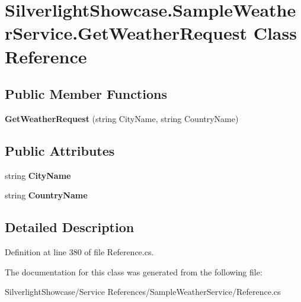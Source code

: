 \hypertarget{class_silverlight_showcase_1_1_sample_weather_service_1_1_get_weather_request}{
\section{SilverlightShowcase.SampleWeatherService.GetWeatherRequest Class Reference}
\label{class_silverlight_showcase_1_1_sample_weather_service_1_1_get_weather_request}
}
\subsection*{Public Member Functions}
\begin{DoxyCompactItemize}
\item 
\hypertarget{class_silverlight_showcase_1_1_sample_weather_service_1_1_get_weather_request_a1fa74c6662cc32c1ea8ee24805762381}{
{\bfseries GetWeatherRequest} (string CityName, string CountryName)}
\label{class_silverlight_showcase_1_1_sample_weather_service_1_1_get_weather_request_a1fa74c6662cc32c1ea8ee24805762381}

\end{DoxyCompactItemize}
\subsection*{Public Attributes}
\begin{DoxyCompactItemize}
\item 
\hypertarget{class_silverlight_showcase_1_1_sample_weather_service_1_1_get_weather_request_aaf78b13634979a4778659b2f486ad012}{
string {\bfseries CityName}}
\label{class_silverlight_showcase_1_1_sample_weather_service_1_1_get_weather_request_aaf78b13634979a4778659b2f486ad012}

\item 
\hypertarget{class_silverlight_showcase_1_1_sample_weather_service_1_1_get_weather_request_a449b5b5701ed8bda740d827ac813bc30}{
string {\bfseries CountryName}}
\label{class_silverlight_showcase_1_1_sample_weather_service_1_1_get_weather_request_a449b5b5701ed8bda740d827ac813bc30}

\end{DoxyCompactItemize}


\subsection{Detailed Description}


Definition at line 380 of file Reference.cs.

The documentation for this class was generated from the following file:\begin{DoxyCompactItemize}
\item 
SilverlightShowcase/Service References/SampleWeatherService/Reference.cs\end{DoxyCompactItemize}
